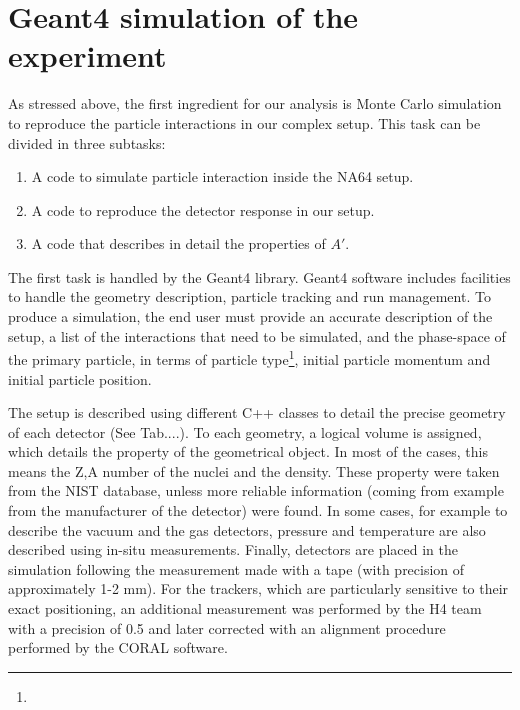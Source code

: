 \section{Geant4 simulation of the experiment}
\label{ch3:sec:geant4}

As stressed above, the first ingredient for our analysis is Monte Carlo simulation to reproduce the particle interactions in our complex setup. This task can be divided in three subtasks:

\begin{enumerate}
\item A code to simulate particle interaction inside the NA64 setup.
\item A code to reproduce the detector response in our setup.  
\item A code that describes in detail the properties of $A'$.
\end{enumerate}

The first task is handled by the Geant4 library\cite{AGOSTINELLI2003250}. Geant4 software includes facilities to handle the geometry description, particle tracking and run management. To produce a simulation, the end user must provide an accurate description of the setup, a list of the interactions that need to be simulated, and the phase-space of the primary particle, in terms of particle type\footnote{}, initial particle momentum and initial particle position.

The setup is described using different C++ classes to detail the precise geometry of each detector (See Tab....). To each geometry, a logical volume is assigned, which details the property of the geometrical object. In most of the cases, this means the Z,A number of the nuclei and the density. These property were taken from the NIST database\cite{nist-database}, unless more reliable information (coming from example from the manufacturer of the detector) were found. In some cases, for example to describe the vacuum and the gas detectors, pressure and temperature are also described using in-situ measurements. Finally, detectors are placed in the simulation following the measurement made with a tape (with precision of approximately 1-2 mm). For the trackers, which are particularly sensitive to their exact positioning, an additional measurement was performed by the H4 team with a precision of 0.5 \mmi\cite{meterology-measurements} and later corrected with an alignment procedure performed by the CORAL software\cite{ABBON2007455}.

